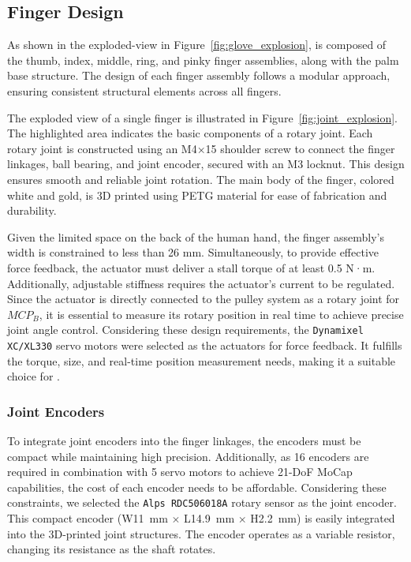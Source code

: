 \subsection{Finger Design}



As shown in the exploded-view in Figure~\ref{fig:glove_explosion}, \oursystem is composed of the thumb, index, middle, ring, and pinky finger assemblies, along with the palm base structure. The design of each finger assembly follows a modular approach, ensuring consistent structural elements across all fingers.

The exploded view of a single finger is illustrated in Figure~\ref{fig:joint_explosion}. The highlighted area indicates the basic components of a rotary joint. Each rotary joint is constructed using an M4×15 shoulder screw to connect the finger linkages, ball bearing, and joint encoder, secured with an M3 locknut. This design ensures smooth and reliable joint rotation.
The main body of the finger, colored white and gold, is 3D printed using PETG material for ease of fabrication and durability.

Given the limited space on the back of the human hand, the finger assembly's width is constrained to less than 26 mm. Simultaneously, to provide effective force feedback, the actuator must deliver a stall torque of at least 0.5 N·m. Additionally, adjustable stiffness requires the actuator's current to be regulated. Since the actuator is directly connected to the pulley system as a rotary joint for $MCP_B$, it is essential to measure its rotary position in real time to achieve precise joint angle control.
Considering these design requirements, the \texttt{Dynamixel XC/XL330} servo motors were selected as the actuators for force feedback. It fulfills the torque, size, and real-time position measurement needs, making it a suitable choice for \oursystem.

\vspace{1mm}
\subsubsection{\textbf{Joint Encoders}}
\leavevmode

To integrate joint encoders into the finger linkages, the encoders must be compact while maintaining high precision. Additionally, as 16 encoders are required in combination with 5 servo motors to achieve 21-DoF MoCap capabilities, the cost of each encoder needs to be affordable. Considering these constraints, we selected the \texttt{Alps RDC506018A} rotary sensor as the joint encoder. 
%
This compact encoder (W11~mm $\times$ L14.9~mm $\times$ H2.2~mm) is easily integrated into the 3D-printed joint structures. The encoder operates as a variable resistor, changing its resistance as the shaft rotates. 

